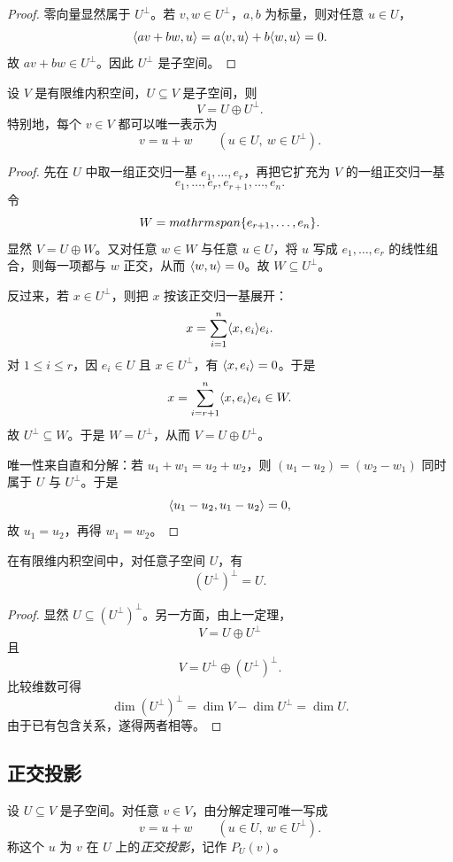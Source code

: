 \begin{proof}
零向量显然属于 $U^{\perp}$。若 $v,w\in U^{\perp}$，$a,b$ 为标量，则对任意 $u\in U$，
\[
\langle av+bw, u \rangle=a\langle v, u \rangle+b\langle w, u \rangle=0.
\]
故 $av+bw\in U^{\perp}$。因此 $U^{\perp}$ 是子空间。
\end{proof}

\begin{theorem}
设 $V$ 是有限维内积空间，$U\subseteq V$ 是子空间，则
\[
V=U\oplus U^{\perp}.
\]
特别地，每个 $v\in V$ 都可以唯一表示为
\[
v=u+w\qquad (u\in U,\ w\in U^{\perp}).
\]
\end{theorem}

\begin{proof}
先在 $U$ 中取一组正交归一基 $e_1,\dots,e_r$，再把它扩充为 $V$ 的一组正交归一基
\[
e_1,\dots,e_r,e_{r+1},\dots,e_n.
\]
令
\[
W=\\mathrm{span}\{e_{r+1},\dots,e_n\}.
\]
显然 $V=U\oplus W$。又对任意 $w\in W$ 与任意 $u\in U$，将 $u$ 写成 $e_1,\dots,e_r$ 的线性组合，则每一项都与 $w$ 正交，从而 $\langle w, u \rangle=0$。故 $W\subseteq U^{\perp}$。

反过来，若 $x\in U^{\perp}$，则把 $x$ 按该正交归一基展开：
\[
x=\sum_{i=1}^n \langle x, e_i \rangle e_i.
\]
对 $1\le i\le r$，因 $e_i\in U$ 且 $x\in U^{\perp}$，有 $\langle x, e_i \rangle=0$。于是
\[
x=\sum_{i=r+1}^n \langle x, e_i \rangle e_i\in W.
\]
故 $U^{\perp}\subseteq W$。于是 $W=U^{\perp}$，从而 $V=U\oplus U^{\perp}$。

唯一性来自直和分解：若 $u_1+w_1=u_2+w_2$，则 $(u_1-u_2)=(w_2-w_1)$ 同时属于 $U$ 与 $U^{\perp}$。于是
\[
\langle u_1-u_2, u_1-u_2 \rangle=0,
\]
故 $u_1=u_2$，再得 $w_1=w_2$。
\end{proof}

\begin{corollary}
在有限维内积空间中，对任意子空间 $U$，有
\[
(U^{\perp})^{\perp}=U.
\]
\end{corollary}

\begin{proof}
显然 $U\subseteq (U^{\perp})^{\perp}$。另一方面，由上一定理，
\[
V=U\oplus U^{\perp}
\]
且
\[
V=U^{\perp}\oplus (U^{\perp})^{\perp}.
\]
比较维数可得
\[
\dim (U^{\perp})^{\perp}=\dim V-\dim U^{\perp}=\dim U.
\]
由于已有包含关系，遂得两者相等。
\end{proof}

\subsection{正交投影}

\begin{definition}
设 $U\subseteq V$ 是子空间。对任意 $v\in V$，由分解定理可唯一写成
\[
v=u+w\qquad (u\in U,\ w\in U^{\perp}).
\]
称这个 $u$ 为 $v$ 在 $U$ 上的\emph{正交投影}，记作 $P_U(v)$。
\end{definition}

